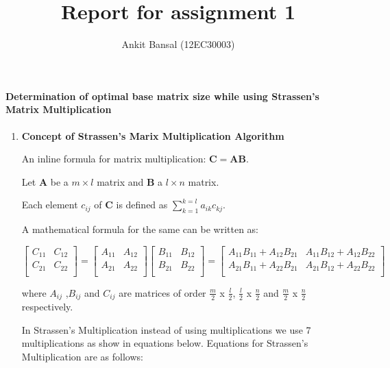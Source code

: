 \documentclass[a4paper,11pt]{article}
\title{Report for assignment 1}
\author{Ankit Bansal (12EC30003)}
\begin{document}
\maketitle

\paragraph{Determination of optimal base matrix size while using Strassen's Matrix Multiplication}
\begin{enumerate}

 \item \textbf{Concept of Strassen's Marix Multiplication Algorithm}

An inline formula for matrix multiplication: $\mathbf{C} = \mathbf{A} \mathbf{B}$.

Let $\mathbf{A}$ be a $m \times l$ matrix and $\mathbf{B}$
a $l \times n$ matrix.

Each element $c_{ij}$ of $\mathbf{C}$ is defined as
$\sum_{k=1}^{k=l} a_{ik}c_{kj}$.

A mathematical formula for the same can be written as:

\(
\left[
\begin{array}{cc}
C_{11}&C_{12}\\
C_{21}&C_{22}\\
\end{array}
\right]
=
\left[
\begin{array}{cc}
A_{11}&A_{12}\\
A_{21}&A_{22}\\
\end{array}
\right]
\left[
\begin{array}{cc}
B_{11}&B_{12}\\
B_{21}&B_{22}\\
\end{array}
\right]
=
\left[
\begin{array}{cc}
A_{11}B_{11} + A_{12}B_{21} & A_{11}B_{12} + A_{12}B_{22}\\
A_{21}B_{11} + A_{22}B_{21} & A_{21}B_{12} + A_{22}B_{22}\\
\end{array}
\right]
\)

where $A_{ij}$ ,$ B_{ij}$ and $C_{ij}$  are matrices of order $\frac{m}{2}$ x $\frac{l}{2}$, $\frac{l}{2}$ x $\frac{n}{2}$ and $\frac{m}{2}$ x $\frac{n}{2}$ respectively.

In Strassen's Multiplication instead of using  multiplications we use 7 multiplications as show in equations below. Equations for Strassen's Multiplication are as follows:


\end{enumerate}
\end{document}
